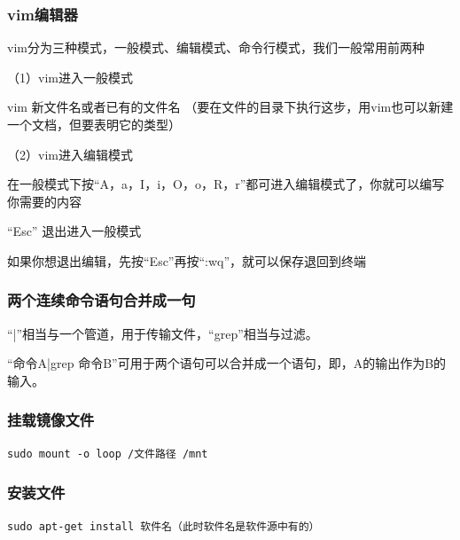 \documentclass{article}
\begin{document}
\subsubsection{vim编辑器}
vim分为三种模式，一般模式、编辑模式、命令行模式，我们一般常用前两种

（1）vim进入一般模式

vim 新文件名或者已有的文件名  （要在文件的目录下执行这步，用vim也可以新建一个文档，但要表明它的类型）

（2）vim进入编辑模式

在一般模式下按“A，a，I，i，O，o，R，r”都可进入编辑模式了，你就可以编写你需要的内容

“Esc” 退出进入一般模式

如果你想退出编辑，先按“Esc”再按“:wq”，就可以保存退回到终端
\subsubsection{两个连续命令语句合并成一句}
“|”相当与一个管道，用于传输文件，“grep”相当与过滤。

“命令A|grep 命令B”可用于两个语句可以合并成一个语句，即，A的输出作为B的输入。

\subsubsection{挂载镜像文件}
\begin{lstlisting}
sudo mount -o loop /文件路径 /mnt
\end{lstlisting}
\subsubsection{安装文件}
\begin{lstlisting}
sudo apt-get install 软件名（此时软件名是软件源中有的）
\end{lstlisting}
\end{document}
